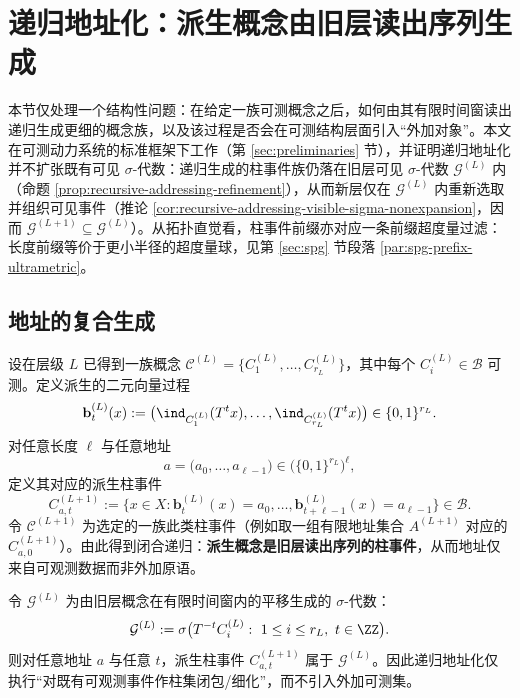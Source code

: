 \section{递归地址化：派生概念由旧层读出序列生成}\label{sec:recursive-addressing}

本节仅处理一个结构性问题：在给定一族可测概念之后，如何由其有限时间窗读出递归生成更细的概念族，以及该过程是否会在可测结构层面引入“外加对象”。本文在可测动力系统的标准框架下工作（第 \ref{sec:preliminaries} 节），并证明递归地址化并不扩张既有可见 \(\sigma\)-代数：递归生成的柱事件族仍落在旧层可见 \(\sigma\)-代数 \(\mathcal{G}^{(L)}\) 内（命题 \ref{prop:recursive-addressing-refinement}），从而新层仅在 \(\mathcal{G}^{(L)}\) 内重新选取并组织可见事件（推论 \ref{cor:recursive-addressing-visible-sigma-nonexpansion}，因而 \(\mathcal{G}^{(L+1)}\subseteq \mathcal{G}^{(L)}\)）。从拓扑直觉看，柱事件前缀亦对应一条前缀超度量过滤：长度前缀等价于更小半径的超度量球，见第 \ref{sec:spg} 节段落 \ref{par:spg-prefix-ultrametric}。

\subsection{地址的复合生成}

设在层级 $L$ 已得到一族概念 $\mathcal{C}^{(L)}=\{C^{(L)}_1,\dots,C^{(L)}_{r_L}\}$，其中每个 $C^{(L)}_i\in\mathcal{B}$ 可测。定义派生的二元向量过程
\[
\mathbf{b}^{(L)}_t(x):=\bigl(\ind_{C^{(L)}_1}(T^t x),\dots,\ind_{C^{(L)}_{r_L}}(T^t x)\bigr)\in\{0,1\}^{r_L}.
\]
对任意长度 $\ell$ 与任意地址
\[
a=\bigl(a_0,\dots,a_{\ell-1}\bigr)\in\bigl(\{0,1\}^{r_L}\bigr)^\ell,
\]
定义其对应的派生柱事件
\[
C^{(L+1)}_{a,t}:=\{x\in X:\mathbf{b}^{(L)}_t(x)=a_0,\dots,\mathbf{b}^{(L)}_{t+\ell-1}(x)=a_{\ell-1}\}\in\mathcal{B}.
\]
令 $\mathcal{C}^{(L+1)}$ 为选定的一族此类柱事件（例如取一组有限地址集合 $A^{(L+1)}$ 对应的 $C^{(L+1)}_{a,0}$）。由此得到闭合递归：\textbf{派生概念是旧层读出序列的柱事件}，从而地址仅来自可观测数据而非外加原语。

\begin{proposition}\label{prop:recursive-addressing-refinement}
令 $\mathcal{G}^{(L)}$ 为由旧层概念在有限时间窗内的平移生成的 $\sigma$-代数：
\[
\mathcal{G}^{(L)}:=\sigma\bigl(T^{-t}C_i^{(L)}:\ 1\le i\le r_L,\ t\in\ZZ\bigr).
\]
则对任意地址 $a$ 与任意 $t$，派生柱事件 $C^{(L+1)}_{a,t}$ 属于 $\mathcal{G}^{(L)}$。因此递归地址化仅执行“对既有可观测事件作柱集闭包/细化”，而不引入外加可测集。
\end{proposition}

